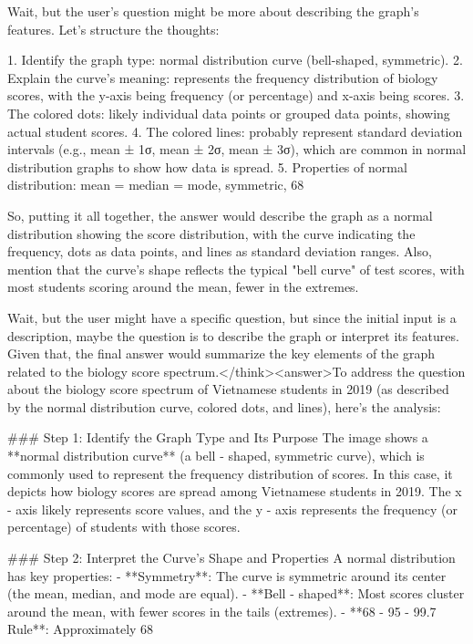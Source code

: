Wait, but the user's question might be more about describing the graph's features. Let's structure the thoughts:

1. Identify the graph type: normal distribution curve (bell-shaped, symmetric).
2. Explain the curve's meaning: represents the frequency distribution of biology scores, with the y-axis being frequency (or percentage) and x-axis being scores.
3. The colored dots: likely individual data points or grouped data points, showing actual student scores.
4. The colored lines: probably represent standard deviation intervals (e.g., mean ± 1σ, mean ± 2σ, mean ± 3σ), which are common in normal distribution graphs to show how data is spread.
5. Properties of normal distribution: mean = median = mode, symmetric, 68%

So, putting it all together, the answer would describe the graph as a normal distribution showing the score distribution, with the curve indicating the frequency, dots as data points, and lines as standard deviation ranges. Also, mention that the curve's shape reflects the typical "bell curve" of test scores, with most students scoring around the mean, fewer in the extremes.

Wait, but the user might have a specific question, but since the initial input is a description, maybe the question is to describe the graph or interpret its features. Given that, the final answer would summarize the key elements of the graph related to the biology score spectrum.</think><answer>To address the question about the biology score spectrum of Vietnamese students in 2019 (as described by the normal distribution curve, colored dots, and lines), here’s the analysis:  

### Step 1: Identify the Graph Type and Its Purpose  
The image shows a **normal distribution curve** (a bell - shaped, symmetric curve), which is commonly used to represent the frequency distribution of scores. In this case, it depicts how biology scores are spread among Vietnamese students in 2019. The x - axis likely represents score values, and the y - axis represents the frequency (or percentage) of students with those scores.  

### Step 2: Interpret the Curve’s Shape and Properties  
A normal distribution has key properties:  
- **Symmetry**: The curve is symmetric around its center (the mean, median, and mode are equal).  
- **Bell - shaped**: Most scores cluster around the mean, with fewer scores in the tails (extremes).  
- **68 - 95 - 99.7 Rule**: Approximately 68%

